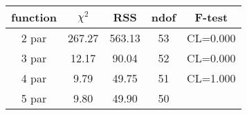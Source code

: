 \begin{tabular}{c|c|c|c|c}
function & $\chi^2$ & RSS & ndof & F-test \\
\hline
2 par & 267.27 & 563.13 & 53 & CL=0.000 \\
3 par & 12.17 & 90.04 & 52 & CL=0.000 \\
4 par & 9.79 & 49.75 & 51 & CL=1.000 \\
5 par & 9.80 & 49.90 & 50 & \\
\hline
\end{tabular}